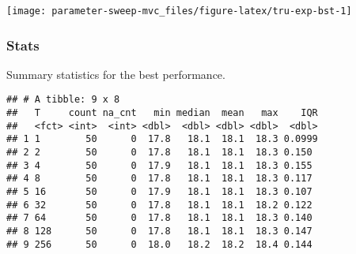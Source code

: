 \documentclass[]{book}
\newenvironment{Shaded}{\begin{snugshade}}{\end{snugshade}}
\newcommand{\DataTypeTok}[1]{\textcolor[rgb]{0.13,0.29,0.53}{#1}}
\newcommand{\KeywordTok}[1]{\textcolor[rgb]{0.13,0.29,0.53}{\textbf{#1}}}
\newcommand{\NormalTok}[1]{#1}
\newcommand{\OperatorTok}[1]{\textcolor[rgb]{0.81,0.36,0.00}{\textbf{#1}}}
\newcommand{\OtherTok}[1]{\textcolor[rgb]{0.56,0.35,0.01}{#1}}
\newcommand{\StringTok}[1]{\textcolor[rgb]{0.31,0.60,0.02}{#1}}
\begin{document}
\texttt{[image: parameter-sweep-mvc\_files/figure-latex/tru-exp-bst-1]}

\hypertarget{stats}{%
\subsubsection{Stats}\label{stats}}

Summary statistics for the best performance.

\begin{Shaded}
\end{Shaded}

\begin{verbatim}
## # A tibble: 9 x 8
##   T     count na_cnt   min median  mean   max    IQR
##   <fct> <int>  <int> <dbl>  <dbl> <dbl> <dbl>  <dbl>
## 1 1        50      0  17.8   18.1  18.1  18.3 0.0999
## 2 2        50      0  17.8   18.1  18.1  18.3 0.150 
## 3 4        50      0  17.9   18.1  18.1  18.3 0.155 
## 4 8        50      0  17.8   18.1  18.1  18.3 0.117 
## 5 16       50      0  17.9   18.1  18.1  18.3 0.107 
## 6 32       50      0  17.8   18.1  18.1  18.2 0.122 
## 7 64       50      0  17.8   18.1  18.1  18.3 0.140 
## 8 128      50      0  17.8   18.1  18.1  18.3 0.147 
## 9 256      50      0  18.0   18.2  18.2  18.4 0.144
\end{verbatim}
\end{document}
